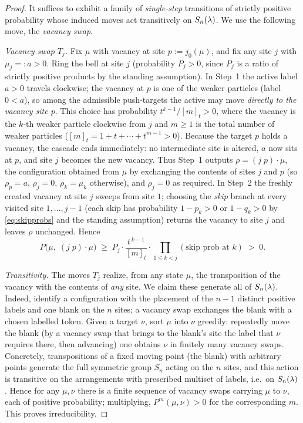 \begin{proof}
It suffices to exhibit a family of \emph{single-step} transitions of strictly
positive probability whose induced moves act transitively on $S_n(\lambda)$. We use
the following move, the \emph{vacancy swap}.

\smallskip
\noindent\emph{Vacancy swap $T_j$.} Fix $\mu$ with vacancy at site $p:=j_0(\mu)$,
and fix any site $j$ with $\mu_j=:a>0$. Ring the bell at site $j$ (probability
$P_j>0$, since $P_j$ is a ratio of strictly positive products by the standing
assumption). In Step~1 the active label $a>0$ travels clockwise; the vacancy at
$p$ is one of the weaker particles (label $0<a$), so among the admissible
push-targets the active may move \emph{directly to the vacancy site $p$}. This
choice has probability $t^{k-1}/[m]_t>0$, where the vacancy is the $k$-th weaker
particle clockwise from $j$ and $m\ge1$ is the total number of weaker particles
($[m]_t=1+t+\cdots+t^{m-1}>0$). Because the target $p$ holds a vacancy, the
cascade ends immediately: no intermediate site is altered, $a$ now sits at $p$,
and site $j$ becomes the new vacancy. Thus Step~1 outputs
$\rho=(j\;p)\!\cdot\!\mu$, the configuration obtained from $\mu$ by exchanging the
contents of sites $j$ and $p$ (so $\rho_p=a$, $\rho_j=0$, $\rho_k=\mu_k$
otherwise), and $\rho_j=0$ as required. In Step~2 the freshly created vacancy at
site $j$ sweeps from site $1$; choosing the \emph{skip} branch at every visited
site $1,\dots,j-1$ (each skip has probability $1-p_k>0$ or $1-q_k>0$ by
\eqref{eq:skipprobs} and the standing assumption) returns the vacancy to site $j$
and leaves $\rho$ unchanged. Hence
\[
P\bigl(\mu,\;(j\;p)\!\cdot\!\mu\bigr)\;\ge\;
P_j\cdot\frac{t^{\,k-1}}{[m]_t}\cdot\!\!\prod_{1\le k<j}\!(\text{skip prob at }k)\;>\;0 .
\]

\smallskip
\noindent\emph{Transitivity.} The moves $T_j$ realize, from any state $\mu$, the
transposition of the vacancy with the contents of \emph{any} site. We claim these
generate all of $S_n(\lambda)$. Indeed, identify a configuration with the placement
of the $n-1$ distinct positive labels and one blank on the $n$ sites; a vacancy
swap exchanges the blank with a chosen labelled token. Given a target $\nu$,
sort $\mu$ into $\nu$ greedily: repeatedly move the blank (by a vacancy swap that
brings to the blank's site the label that $\nu$ requires there, then advancing)
one obtains $\nu$ in finitely many vacancy swaps. Concretely, transpositions of a
fixed moving point (the blank) with arbitrary points generate the full symmetric
group $S_n$ acting on the $n$ sites, and this action is transitive on the
arrangements with prescribed multiset of labels, i.e.\ on $S_n(\lambda)$. Hence for
any $\mu,\nu$ there is a finite sequence of vacancy swaps carrying $\mu$ to $\nu$,
each of positive probability; multiplying, $P^m(\mu,\nu)>0$ for the corresponding
$m$. This proves irreducibility.
\end{proof}


